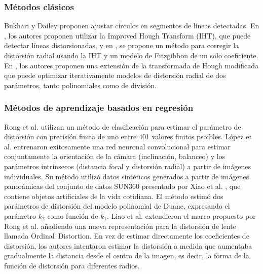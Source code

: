 \documentclass[12pt]{article}
\numberwithin{equation}{section}%
\newcommand{\lightit}[1]{{\lightitfont #1}}
\begin{document}
\subsubsection{Métodos clásicos}
Bukhari y Dailey \cite{bukhari2013automatic} proponen ajustar círculos en segmentos de líneas detectadas. En \cite{aleman2014line}, los autores proponen utilizar la \lightit{Improved Hough Transform} (IHT), que puede detectar líneas distorsionadas, y en \cite{aleman2014automatic}, se propone un método para corregir la distorsión radial usando la IHT y un modelo de Fitzgibbon de un solo coeficiente. En \cite{santana2016iterative}, los autores proponen una extensión de la transformada de Hough modificada que puede optimizar iterativamente modelos de distorsión radial de dos parámetros, tanto polinomiales como de división.

\newpage

\subsubsection{Métodos de aprendizaje basados en regresión}
Rong et al. \cite{rong2016radial} utilizan un método de clasificación para estimar el parámetro de distorsión con precisión finita de uno entre 401 valores finitos psoibles. López et al. \cite{lopez2019deep} entrenaron exitosamente una red neuronal convolucional para estimar conjuntamente la orientación de la cámara (inclinación, balanceo) y los parámetros intrínsecos (distancia focal y distorsión radial) a partir de imágenes individuales. Su método utilizó datos sintéticos generados a partir de imágenes panorámicas del conjunto de datos SUN360 presentado por Xiao et al. \cite{xiao2012recognizing}, que contiene objetos artificiales de la vida cotidiana. El método estimó dos parámetros de distorsión del modelo polinomial de Duane, expresando el parámetro \(k_2\) como función de \(k_1\). Liao et al. \cite{liao2021deep} extendieron el marco propuesto por Rong et al. \cite{rong2016radial} añadiendo una nueva representación para la distorsión de lente llamada \lightit{Ordinal\ Distortion}. En vez de estimar directamente los coeficientes de distorsión, los autores intentaron estimar la distorsión a medida que aumentaba gradualmente la distancia desde el centro de la imagen, es decir, la forma de la función de distorsión para diferentes radios.
\end{document}
